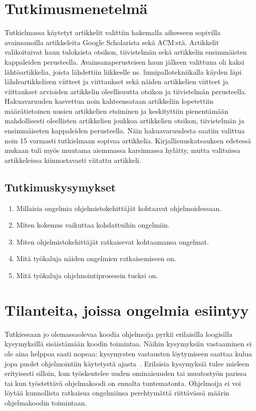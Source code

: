 \documentclass[finnish]{../tktltiki2}
\theoremstyle{definition}
\theoremstyle{remark}
\begin{document}
\section{Tutkimusmenetelmä}
Tutkielmassa käytetyt artikkelit valittiin hakemalla aiheeseen sopivilla avainsanoilla artikkeleita Google Scholarista sekä ACM:stä. Artikkelit valikoituivat haun tuloksista otsikon, tiivistelmän sekä artikkelin ensimmäisten kappaleiden perusteella. Avainsanaperusteisen haun jälkeen valittuna oli kaksi lähtöartikkelia, joista lähdettiin liikkeelle ns. lumipallotekniikalla käyden läpi lähdeartikkelieen viitteet ja viittaukset sekä näiden artikkelien viitteet ja viittaukset arvioiden artikkelin oleellisuutta otsikon ja tiivistelmän perusteella. Hakuavaruuden kasvettua noin kahteensataan artikkeliin lopetettiin määrätietoinen uusien artikkelien etsiminen ja keskityttiin pienentämään mahdollisesti oleellisten artikkelien joukkoa artikkelien otsikon, tiivistelmän ja ensimmäiseten kappaleiden perusteella. Näin hakuavaruudesta saatiin valittua noin 15 varmasti tutkielmaan sopivaa artikkelia. Kirjallisuuskatsauksen edetessä mukaan tuli myös muutama aiemmassa karsinnassa hylätty, mutta valituissa artikkeleissa kiinnostavasti viitattu artikkeli.

\subsection{Tutkimuskysymykset}
\begin{enumerate}
\item Millaisia ongelmia ohjelmistokehittäjät kohtaavat ohjelmoidessaan.
\item Miten kokemus vaikuttaa kohdattuihin ongelmiin.
\item Miten ohjelmistokehittäjät ratkaisevat kohtaamansa ongelmat.
\item Mitä työkaluja näiden ongelmien ratkaisemiseen on.
\item Mitä työkaluja ohjelmointiprosessin tueksi on.
\end{enumerate}

\section{Tilanteita, joissa ongelmia esiintyy}
Tutkiessaan jo olemassaolevaa koodia ohjelmoija pyrkii erilaisilla loogisilla kysymyksillä sisäistämään koodin toimintaa. Näihin kysymyksiin vastaaminen ei ole aina helppoa saati nopeaa: kysymysten vastausten löytymiseen saattaa kulua jopa puolet ohjelmointiin käytetystä ajasta~\cite{eliciting-design-requirements-for-maintenance-oriented-ides}. Erilaisia kysymyksiä tulee mieleen erityisesti silloin, kun työskentelee uuden ominaisuuden tai muutostyön parissa tai kun työstettävä ohjelmakoodi on ennalta tuntematonta. Ohjelmoija ei voi löytää kunnollista ratkaisua ongelmiinsa perehtymättä riittävässä määrin ohjelmakoodin toimintaan.
\end{document}
